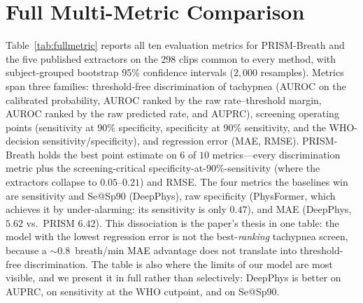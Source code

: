 
\section{Full Multi-Metric Comparison}
\label{app:fullmetric}
Table~\ref{tab:fullmetric} reports all ten evaluation metrics for PRISM-Breath and the five published
extractors on the 298 clips common to every method, with subject-grouped bootstrap 95\% confidence
intervals ($2{,}000$ resamples). Metrics span three families: threshold-free discrimination of tachypnea
(AUROC on the calibrated probability, AUROC ranked by the raw rate--threshold margin, AUROC ranked by the
raw predicted rate, and AUPRC), screening operating points (sensitivity at $90\%$ specificity, specificity
at $90\%$ sensitivity, and the WHO-decision sensitivity/specificity), and regression error (MAE, RMSE).
PRISM-Breath holds the best point estimate on $6$ of $10$ metrics---every discrimination metric plus the
screening-critical specificity-at-$90\%$-sensitivity (where the extractors collapse to $0.05$--$0.21$) and
RMSE. The four metrics the baselines win are sensitivity and Se@Sp$90$ (DeepPhys), raw specificity
(PhysFormer, which achieves it by under-alarming: its sensitivity is only $0.47$), and MAE (DeepPhys,
$5.62$ vs.\ PRISM $6.42$). This dissociation is the paper's thesis in one table: the model with the lowest
regression error is not the best-\emph{ranking} tachypnea screen, because a $\sim$$0.8$~breath/min MAE
advantage does not translate into threshold-free discrimination. The table is also where the limits of our
model are most visible, and we present it in full rather than selectively: DeepPhys is better on AUPRC, on
sensitivity at the WHO cutpoint, and on Se@Sp90.

